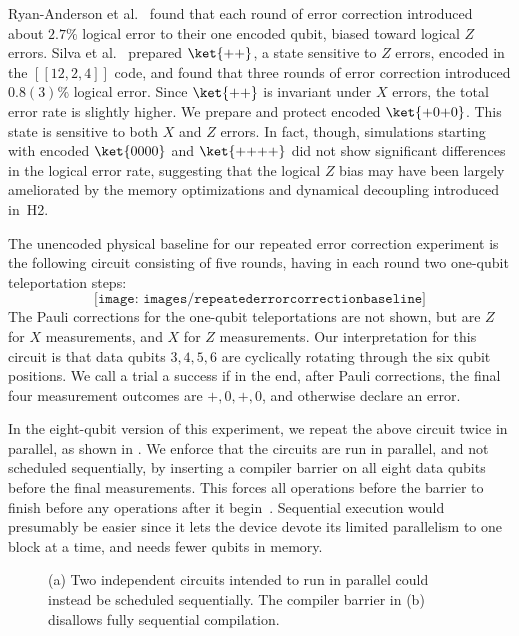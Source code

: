 \documentclass[10pt, twocolumn, aps, nofootinbib, longbibliography, nobibnotes, superscriptaddress]{revtex4-1} %
\begin{document}
Ryan-Anderson et al.~\cite{honeywell21steane} found that each round of error correction introduced about $2.7\%$ logical error to their one encoded qubit, biased toward logical $Z$ errors.  Silva et al.~\cite{Silva24microsoft12qubitcode} prepared $\ket{{+}{+}}$, a state sensitive to $Z$ errors, encoded in the $[[12,2,4]]$ code, and found that three rounds of error correction introduced $0.8(3)\%$ logical error.  Since $\ket{{+}{+}}$ is invariant under $X$ errors, the total error rate is slightly higher.  We prepare and protect encoded $\ket{{+}0{+}0}$.  This state is sensitive to both $X$ and $Z$ errors.  In fact, though, simulations starting with encoded $\ket{0000}$ and $\ket{{+}{+}{+}{+}}$ did not show significant differences in the logical error rate, suggesting that the logical $Z$ bias may have been largely ameliorated by the memory optimizations and dynamical decoupling introduced in~H2.  

\smallskip

The unencoded physical baseline for our repeated error correction experiment is the following circuit consisting of five rounds, having in each round two one-qubit teleportation steps: 
\begin{equation*} %
\texttt{[image: images/repeatederrorcorrectionbaseline]}
\end{equation*}
The Pauli corrections for the one-qubit teleportations are not shown, but are $Z$ for $X$ measurements, and $X$ for $Z$ measurements.  Our interpretation for this circuit is that data qubits $3,4,5,6$ are cyclically rotating through the six qubit positions.  We call a trial a success if in the end, after Pauli corrections, the final four measurement outcomes are ${+}, 0, {+}, 0$, and otherwise declare an error.  

In the eight-qubit version of this experiment, we repeat the above circuit %
twice in parallel, as shown in .  We enforce that the circuits are run in parallel, and not scheduled sequentially, by inserting a compiler barrier on all eight data qubits before the final measurements.  This forces all operations before the barrier to finish before any operations after it begin~\cite{Quantinuum20userguide}.  
Sequential execution would presumably be easier since it lets the device devote its limited parallelism to one block at a time, and needs fewer qubits in memory.  

\begin{figure}
\caption{
(a) Two independent circuits intended to run in parallel could instead be scheduled sequentially.  The compiler barrier in (b) disallows fully sequential compilation.  
}
\end{figure}
\end{document}
